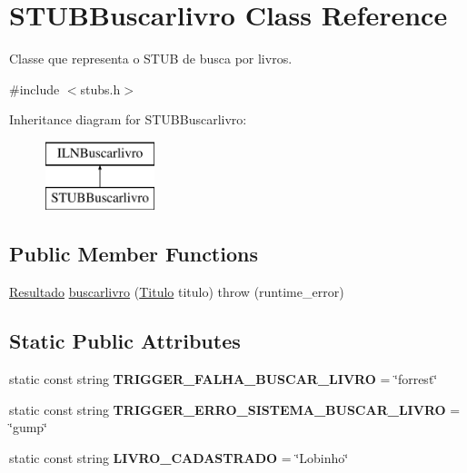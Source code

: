 \hypertarget{classSTUBBuscarlivro}{}\section{S\+T\+U\+B\+Buscarlivro Class Reference}
\label{classSTUBBuscarlivro}


Classe que representa o S\+T\+UB de busca por livros.  




{\ttfamily \#include $<$stubs.\+h$>$}

Inheritance diagram for S\+T\+U\+B\+Buscarlivro\+:\begin{figure}[H]
\begin{center}
\leavevmode
\includegraphics[height=2.000000cm]{classSTUBBuscarlivro}
\end{center}
\end{figure}
\subsection*{Public Member Functions}
\begin{DoxyCompactItemize}
\item 
\hyperlink{classResultado}{Resultado} \hyperlink{classSTUBBuscarlivro_a1c3d0080a08f2e9e7bc57454497b3eca}{buscarlivro} (\hyperlink{classTitulo}{Titulo} titulo)  throw (runtime\+\_\+error)
\end{DoxyCompactItemize}
\subsection*{Static Public Attributes}
\begin{DoxyCompactItemize}
\item 
\mbox{\label{classSTUBBuscarlivro_acd3cf870633a937703102409213a4f63}} 
static const string {\bfseries T\+R\+I\+G\+G\+E\+R\+\_\+\+F\+A\+L\+H\+A\+\_\+\+B\+U\+S\+C\+A\+R\+\_\+\+L\+I\+V\+RO} = \char`\"{}forrest\char`\"{}
\item 
\mbox{\label{classSTUBBuscarlivro_a6f8d3e3d50b130baeea5945e874b3bf3}} 
static const string {\bfseries T\+R\+I\+G\+G\+E\+R\+\_\+\+E\+R\+R\+O\+\_\+\+S\+I\+S\+T\+E\+M\+A\+\_\+\+B\+U\+S\+C\+A\+R\+\_\+\+L\+I\+V\+RO} = \char`\"{}gump\char`\"{}
\item 
\mbox{\label{classSTUBBuscarlivro_a45efb21c64109d5b6ac6a289c061d751}} 
static const string {\bfseries L\+I\+V\+R\+O\+\_\+\+C\+A\+D\+A\+S\+T\+R\+A\+DO} = \char`\"{}Lobinho\char`\"{}
\end{DoxyCompactItemize}


